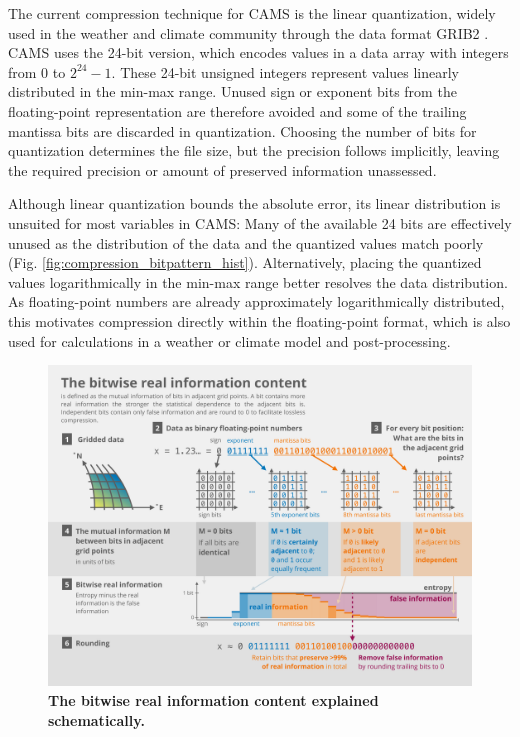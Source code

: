 The current compression technique for CAMS is the linear quantization, widely used in the weather and climate
community through the data format GRIB2 \citep{WMO2003}. CAMS uses the 24-bit version, which encodes values
in a data array with integers from $0$ to $2^{24}-1$. These 24-bit unsigned integers represent values linearly distributed
in the min-max range. Unused sign or exponent bits from the floating-point representation are therefore avoided and
some of the trailing mantissa bits are discarded in quantization. Choosing the number of bits for quantization
determines the file size, but the precision follows implicitly, leaving the required precision or amount of preserved
information unassessed.

Although linear quantization bounds the absolute error, its linear distribution is unsuited for most variables in CAMS:
Many of the available 24 bits are effectively unused as the distribution of the data and the quantized values match
poorly (Fig. \ref{fig:compression_bitpattern_hist}). Alternatively, placing the quantized values logarithmically in the
min-max range better resolves the data distribution. As floating-point numbers are already approximately logarithmically
distributed, this motivates compression directly within the floating-point format, which is also used for calculations in a
weather or climate model and post-processing.

\begin{figure}[tbhp]
	\includegraphics[width=1\textwidth]{Figures/compression/infograph_cut.pdf}
	\caption{\textbf{The bitwise real information content explained schematically.}}
	\label{fig:infograph}
\end{figure}

